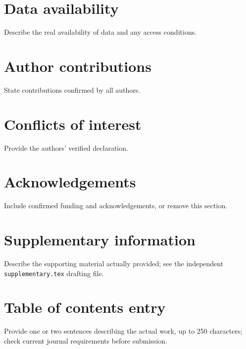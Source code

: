 \documentclass[a4paper,10pt,twocolumn]{article}
\begin{document}
\section*{Data availability}
Describe the real availability of data and any access conditions.
\section*{Author contributions}
State contributions confirmed by all authors.
\section*{Conflicts of interest}
Provide the authors' verified declaration.
\section*{Acknowledgements}
Include confirmed funding and acknowledgements, or remove this section.
\section*{Supplementary information}
Describe the supporting material actually provided; see the independent
\texttt{supplementary.tex} drafting file.


\clearpage
\onecolumn
\section*{Table of contents entry}
\noindent{}
\par\medskip
Provide one or two sentences describing the actual work, up to 250 characters;
check current journal requirements before submission.
\end{document}
